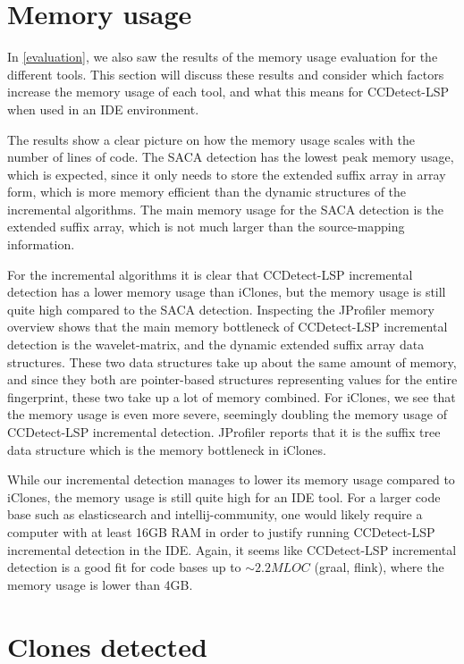 \section{Memory usage}

In \cref{evaluation}, we also saw the results of the memory usage evaluation for the
different tools. This section will discuss these results and consider which factors
increase the memory usage of each tool, and what this means for CCDetect-LSP when used in
an IDE environment.

The results show a clear picture on how the memory usage scales with the number of lines
of code. The SACA detection has the lowest peak memory usage, which is expected, since it
only needs to store the extended suffix array in array form, which is more memory
efficient than the dynamic structures of the incremental algorithms. The main memory usage
for the SACA detection is the extended suffix array, which is not much larger than the
source-mapping information.

For the incremental algorithms it is clear that CCDetect-LSP incremental detection has a
lower memory usage than iClones, but the memory usage is still quite high compared to the
SACA detection. Inspecting the JProfiler memory overview shows that the main memory
bottleneck of CCDetect-LSP incremental detection is the wavelet-matrix, and the dynamic
extended suffix array data structures. These two data structures take up about the same
amount of memory, and since they both are pointer-based structures representing values for
the entire fingerprint, these two take up a lot of memory combined. For iClones, we see
that the memory usage is even more severe, seemingly doubling the memory usage of
CCDetect-LSP incremental detection. JProfiler reports that it is the suffix tree data
structure which is the memory bottleneck in iClones. 

While our incremental detection manages to lower its memory usage compared to iClones, the
memory usage is still quite high for an IDE tool. For a larger code base such as
elasticsearch and intellij-community, one would likely require a computer with at least
16GB RAM in order to justify running CCDetect-LSP incremental detection in the IDE. Again,
it seems like CCDetect-LSP incremental detection is a good fit for code bases up to
${\sim}2.2MLOC$ (graal, flink), where the memory usage is lower than 4GB.

\section{Clones detected}

